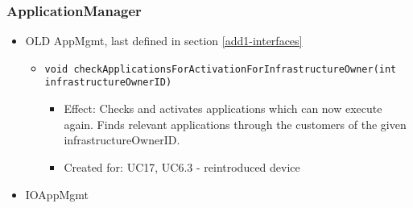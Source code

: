 {{{    \subsubsection{ApplicationManager}
        \begin{itemize}
            \item OLD AppMgmt, last defined in section \ref{add1-interfaces}
                \begin{itemize}
                    \item \texttt{void checkApplicationsForActivationForInfrastructureOwner(int infrastructureOwnerID)}
                        \begin{itemize}
                			\item Effect: Checks and activates applications which can now execute again. Finds relevant applications through the customers of the given infrastructureOwnerID.
                			\item Created for: UC17, UC6.3 - reintroduced device
                        \end{itemize}
                \end{itemize}
            \item IOAppMgmt
        \end{itemize}

}}}
